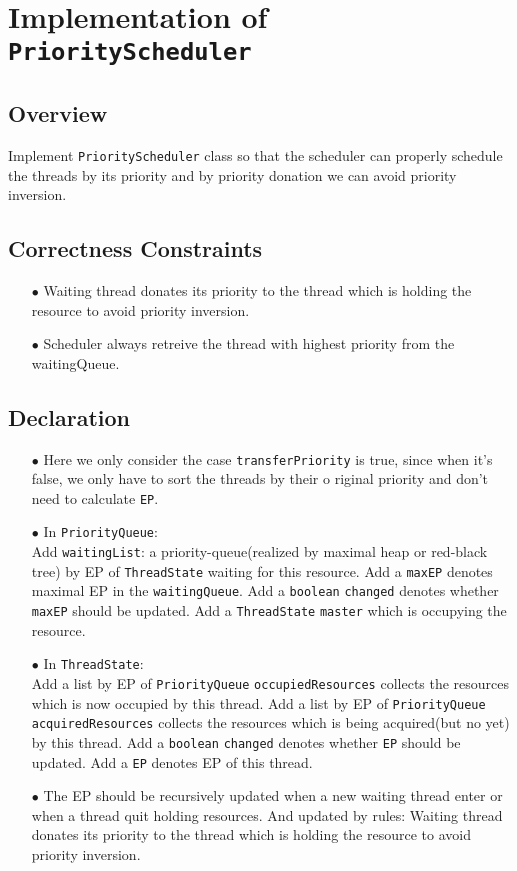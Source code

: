\documentclass{article}
\begin{document}
\section{Implementation of \texttt{PriorityScheduler}}
\subsection{Overview}
Implement \texttt{PriorityScheduler} class so that the scheduler can properly schedule the threads by its priority and by priority donation 
we can avoid priority inversion.
\subsection{Correctness Constraints}
\begin{enumerate}
	\item[$\bullet$] Waiting thread donates its priority to the thread which is holding the resource to avoid priority inversion.
	\item[$\bullet$] Scheduler always retreive the thread with highest priority from the waitingQueue.
\end{enumerate}
\subsection{Declaration}
\begin{enumerate}
	\item[$\bullet$] Here we only consider the case \texttt{transferPriority} is true, since when it's false, we only have to sort the threads by 
		their o riginal priority and don't need to calculate \texttt{EP}.
	\item[$\bullet$] In \texttt{PriorityQueue}: \\
		Add \texttt{waitingList}: a priority-queue(realized by maximal heap or red-black tree) by EP of \texttt{ThreadState} waiting for this resource.
		Add a \texttt{maxEP} denotes maximal EP in the \texttt{waitingQueue}.
		Add a \texttt{boolean} \texttt{changed} denotes whether \texttt{maxEP} should be updated.
		Add a \texttt{ThreadState} \texttt{master} which is occupying the resource.
	\item[$\bullet$] In \texttt{ThreadState}: \\
		Add a list by EP of \texttt{PriorityQueue} \texttt{occupiedResources} collects the resources which is now occupied by this thread. 
		Add a list by EP of \texttt{PriorityQueue} \texttt{acquiredResources} collects the resources which is being acquired(but no yet) by this thread.
		Add a \texttt{boolean} \texttt{changed} denotes whether \texttt{EP} should be updated.
		Add a \texttt{EP} denotes EP of this thread.
	\item[$\bullet$] The EP should be recursively updated when a new waiting thread enter or when a thread quit holding resources. 
		And updated by rules: Waiting thread donates its priority to the thread which is holding the resource to avoid priority inversion.
\end{enumerate}
\end{document}
